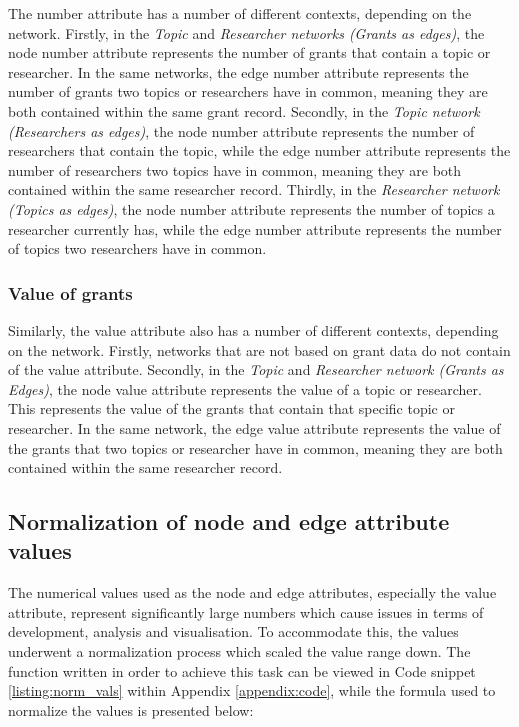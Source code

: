 The number attribute has a number of different contexts, depending on the network. Firstly, in the \textit{Topic} and \textit{Researcher networks (Grants as edges)}, the node number attribute represents the number of grants that contain a topic or researcher. In the same networks, the edge number attribute represents the number of grants two topics or researchers have in common, meaning they are both contained within the same grant record. Secondly, in the \textit{Topic network (Researchers as edges)}, the node number attribute represents the number of researchers that contain the topic, while the edge number attribute represents the number of researchers two topics have in common, meaning they are both contained within the same researcher record. Thirdly, in the \textit{Researcher network (Topics as edges)}, the node number attribute represents the number of topics a researcher currently has, while the edge number attribute represents the number of topics two researchers have in common.

\subsubsection{Value of grants}

Similarly, the value attribute also has a number of different contexts, depending on the network. Firstly, networks that are not based on grant data do not contain of the value attribute. Secondly, in the \textit{Topic} and \textit{Researcher network (Grants as Edges)}, the node value attribute represents the value of a topic or researcher. This represents the value of the grants that contain that specific topic or researcher. In the same network, the edge value attribute represents the value of the grants that two topics or researcher have in common, meaning they are both contained within the same researcher record.

\subsection{Normalization of node and edge attribute values}

The numerical values used as the node and edge attributes, especially the value attribute, represent significantly large numbers which cause issues in terms of development, analysis and visualisation. To accommodate this, the values underwent a normalization process which scaled the value range down. The function written in order to achieve this task can be viewed in Code snippet \ref{listing:norm_vals} within Appendix \ref{appendix:code}, while the formula used to normalize the values is presented below:

